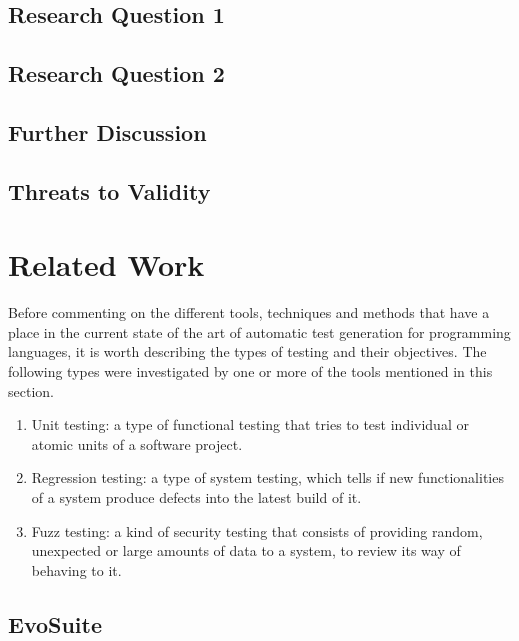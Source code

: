 \documentclass[%
  chapterprefix=false,%
  open=right,%
  twoside=true,%
  paper=a4,%
  logofile={Figures/logo.png},%
  thesistype=master,%
  UKenglish,%
]{se2thesis}
\begin{document}

\section{Research Question 1}


\section{Research Question 2}


\section{Further Discussion}

\section{Threats to Validity}

\chapter{Related Work}\label{chap:related_work}


Before commenting on the different tools, techniques and methods that have a place in the current state of the art of automatic test generation for programming languages, it is worth describing the types of testing and their objectives. The following types were investigated by one or more of the tools mentioned in this section. 

\begin{enumerate}
  \item Unit testing: a type of functional testing that tries to test individual or atomic units of a software project.
  \item Regression testing: a type of system testing, which tells if new functionalities of a system produce defects into the latest build of it.
  \item Fuzz testing: a kind of security testing that consists of providing random, unexpected or large amounts of data to a system, to review its way of behaving to it.
\end{enumerate}

\section{EvoSuite}
\end{document}
